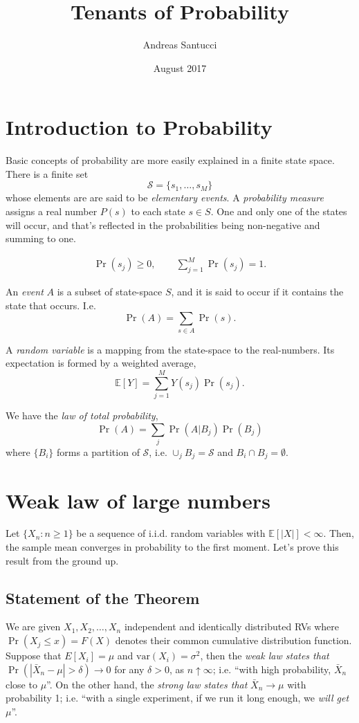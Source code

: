 \documentclass[12pt]{article}\usepackage[]{graphicx}\usepackage[]{color}
\begin{document}
\title{\textbf{Tenants of Probability}}
\author{Andreas Santucci}
\date{August 2017}
\maketitle

\section{Introduction to Probability}
Basic concepts of probability are more easily explained in a finite state space.
There is a finite set
\[
\mathcal S = \{s_1, \ldots, s_M\}
\]
whose elements are are said to be \emph{elementary events}. 
A \emph{probability measure} assigns a real number $P(s)$ to each state $s \in S$.
One and only one of the states will occur, and that's reflected in the probabilities being
non-negative and summing to one.

\begin{align*}   \Pr(s_j) \geq 0, \hspace{25pt} \sum_{j=1}^M \Pr(s_j) = 1. \end{align*}

An \emph{event} $A$ is a subset of state-space $S$, and it is said to occur if it contains the state that occurs. I.e.
\[
\Pr(A) = \sum_{s \in A} \Pr(s).
\]

A \emph{random variable} is a mapping from the state-space to the real-numbers. Its expectation is 
formed by a weighted average,
\[
\mathbb E[Y] = \sum_{j=1}^{M} Y(s_j) \Pr(s_j).
\]

We have the \emph{law of total probability},
\[
\Pr(A) = \sum_{j} \Pr(A|B_j) \Pr(B_j)
\]
where $\{B_i\}$ forms a partition of $\mathcal S$, i.e. $\cup_j B_j = \mathcal S$ and $B_i \cap B_j = \emptyset$.

\section{Weak law of large numbers}
Let $\{X_n : n \geq 1\}$ be a sequence of i.i.d. random variables with
$\mathbb E[|X|] < \infty$. Then, the sample mean converges in probability to the first moment.
Let's prove this result from the ground up.

\subsection{Statement of the Theorem} We are given $X_1, X_2, \ldots, X_n$ independent
and identically distributed RVs where $\Pr(X_j \leq x) = F(X)$ denotes 
their common cumulative distribution function. Suppose that $E[X_i]=\mu$
and $\textrm{var}(X_i) = \sigma^2$, then the \emph{weak law states that}
 $\Pr(|\bar{X}_n - \mu| > \delta) \longrightarrow 0$ for any $\delta > 0$,
as $n \uparrow \infty$; i.e.
``with high probability, $\bar{X}_n$ close to $\mu$''. 
On the other hand, the \emph{strong law states that} $\bar{X}_n \longrightarrow \mu$ with probability 1; i.e.
``with a single experiment, if we run it long enough, we \emph{will get} $\mu$''. 
\end{document}
